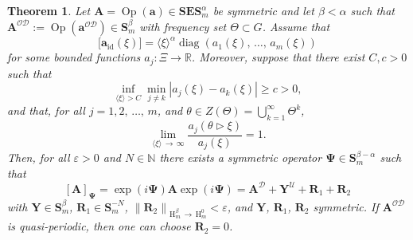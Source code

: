 \documentclass[10pt]{amsart}
\newtheorem{theo}{Theorem}[section]
\theoremstyle{definition}\newtheorem{defi}[theo]{Definition}\newtheorem{rema}[theo]{Remark}\newtheorem{exam}[theo]{Example}\newtheorem{nota}[theo]{Notation}
\DeclareMathOperator{\diag}{diag}
\DeclareMathOperator{\Op}{Op}
\DeclareMathOperator{\id}{id}
\renewcommand{\mathsf}{\mathrm}
\newcommand{\sfH}{\mathsf{H}}
\newcommand{\R}{\mathbb R}
\newcommand{\N}{\mathbb N}
\newcommand{\CD}{\mathcal{D}}
\newcommand{\CO}{\mathcal{O}}
\newcommand{\CU}{\mathcal{U}}
\newcommand{\COD}{{\CO\CD}}
\newcommand{\BPsi}{\boldsymbol \Psi}
\newcommand{\ba}{\mathbf a}
\newcommand{\BA}{\mathbf A}
\newcommand{\BE}{\mathbf E}
\newcommand{\BS}{\mathbf S}
\newcommand{\BR}{\mathbf R}
\newcommand{\BY}{\mathbf Y}
\renewcommand{\epsilon}{\varepsilon}
\newcommand{\act}{\triangleright}
\newcommand{\norm}[1]{\left\| #1 \right\|}
\newcommand{\ang}[1]{\langle #1 \rangle}
\begin{document}
\begin{theo}\label{thm:gtsystem}
Let $\BA = \Op(\ba) \in \BS\BE\BS_{m}^\alpha$ be symmetric and let $\beta<\alpha$ such that $\BA^{\CO\CD}:=\Op(\ba^{\COD}) \in
\BS^\beta_m$ with frequency set $\Theta \subset G$. Assume that
\begin{equation}
\big[\ba_{\id}(\xi)\big]=\ang{\xi}^\alpha\diag(a_1(\xi),\,\dotsc,\,a_m(\xi))
\end{equation}
for some bounded functions $a_j:\Xi\to\R$. Moreover, suppose that there exist $C, c>0$ such that
\begin{equation}\label{eq:ajboundfrombelowbis}
\inf\limits_{\ang \xi >C}\min\limits_{j\neq k} |a_j(\xi)-a_k(\xi)|\geq c>0,
\end{equation}
and that, for all $j=1,2,\,\dots,\,m$, and $\theta\in Z(\Theta)=\bigcup\limits_{k=1}^\infty \Theta^k$,
\begin{equation}\label{eq:shiftsatinfinity}
\lim\limits_{\ang{\xi}\,\to\,\infty} \frac{a_j(\theta\act\xi)}{a_j(\xi)}=1.
\end{equation}
Then, for all $\epsilon>0$ and $N \in \N$ there exists a symmetric operator $\BPsi\in\BS^{\beta-\alpha}_m$ such that
\begin{equation}\label{eq:matgt}
[\BA]_{\BPsi} = \exp(i \BPsi) \BA \exp(i\BPsi) = \BA^{\CD} + \BY^{\CU} +
\BR_1 + \BR_2
\end{equation}
with $\BY\in\BS^\beta_m$, $\BR_1 \in \BS_m^{-N}$, $\norm{\BR_2}_{\sfH_m^{\beta}\,\to\,\sfH_m^{0}} < \epsilon$, and $\BY$, $\BR_1$, $\BR_2$ symmetric. If $\BA^{\COD}$ is quasi-periodic, then one can choose $\BR_2=0$.
\end{theo}
\end{document}
